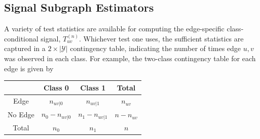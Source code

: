 \documentclass[10pt,journal,cspaper,compsoc]{IEEEtran}
\providecommand{\mc}[1]{\mathcal{#1}}
\begin{document}
\subsection{Signal Subgraph Estimators} %
\label{ssub:subsubsection_name5}



A variety of test statistics are available for computing the edge-specific class-conditional signal, $T_{uv}^{(n)}$. Whichever test one uses, the sufficient statistics are captured in a $2 \times |\mc{Y}|$  contingency table, indicating the number of times edge $u,v$ was observed in each class.  For example, the two-class contingency table for each edge is given by

\begin{table}[h!]
\begin{center}
\begin{tabular}{c||c|c||c}
 & Class 0  & Class 1 & Total \\
\hline\hline
Edge & $n_{uv|0}$ & $n_{uv|1}$ & $n_{uv}$ \\ \hline
No Edge & $n_0-n_{uv|0}$ & $n_1-n_{uv|1}$ & $n-n_{uv}$ \\ \hline \hline
Total & $n_0$ & $n_1$ & $n$\\
\end{tabular}
\end{center}
\label{tab:fwpath}
\end{table}%
\end{document}

